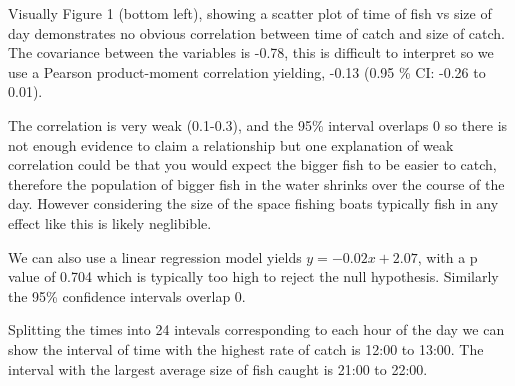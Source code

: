 \documentclass{article}
\begin{document}
Visually Figure 1 (bottom left), showing a scatter plot of time of fish vs size of day demonstrates no obvious correlation between time of catch and size of catch. The covariance between the variables is -0.78, this is difficult to interpret so we use a Pearson product-moment correlation yielding, -0.13 (0.95 \% CI: -0.26 to 0.01).

The correlation is very weak (0.1-0.3), and the 95\% interval overlaps 0 so there is not enough evidence to claim a relationship but one explanation of weak correlation could be that you would expect the bigger fish to be easier to catch, therefore the population of bigger fish in the water shrinks over the course of the day. However considering the size of the space fishing boats typically fish in any effect like this is likely neglibible.  


We can also use a linear regression model yields $ y = -0.02x + 2.07 $, with a p value of 0.704 which is typically too high to reject the null hypothesis. Similarly the 95\% confidence intervals overlap 0. 

Splitting the times into 24 intevals corresponding to each hour of the day we can show the interval of time with the highest rate of catch is 12:00 to  13:00. The interval with the largest average size of fish caught is 21:00 to 22:00. 
\end{document}
